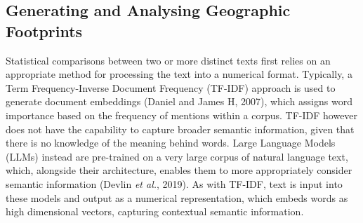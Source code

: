 \documentclass[
]{article}
\begin{document}
\begin{table}

\caption{\label{tbl-sum}Summary of comments relating to each region in our study.}


\end{table}%

\subsection{Generating and Analysing Geographic
Footprints}\label{generating-and-analysing-geographic-footprints}

Statistical comparisons between two or more distinct texts first relies
on an appropriate method for processing the text into a numerical
format. Typically, a Term Frequency-Inverse Document Frequency (TF-IDF)
approach is used to generate document embeddings (Daniel and James H,
2007), which assigns word importance based on the frequency of mentions
within a corpus. TF-IDF however does not have the capability to capture
broader semantic information, given that there is no knowledge of the
meaning behind words. Large Language Models (LLMs) instead are
pre-trained on a very large corpus of natural language text, which,
alongside their architecture, enables them to more appropriately
consider semantic information (Devlin \emph{et al.}, 2019). As with
TF-IDF, text is input into these models and output as a numerical
representation, which embeds words as high dimensional vectors,
capturing contextual semantic information.
\end{document}
